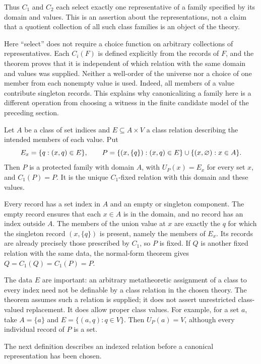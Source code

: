 Thus $C_1$ and $C_2$ each select exactly one representative of a family
specified by its domain and values. This is an assertion about the
representations, not a claim that a quotient collection of all such
class families is an object of the theory.

Here ``select'' does not require a choice function on arbitrary
collections of representatives. Each $C_i(F)$ is defined explicitly
from the records of $F$, and the theorem proves that it is independent
of which relation with the same domain and values was supplied.
Neither a well-order of the universe nor a choice of one member from
each nonempty value is used. Indeed, all members of a value contribute
singleton records. This explains why canonicalizing a family here is
a different operation from choosing a witness in the finite candidate
model of the preceding section.

\begin{theorem}
Let $A$ be a class of set indices and $E\subseteq A\times V$ a class
relation describing the intended members of each value. Put
\[
E_x=\{q:(x,q)\in E\},\qquad
P=\{(x,\{q\}):(x,q)\in E\}
       \cup\{(x,\varnothing):x\in A\}.
\]
Then $P$ is a protected family with domain $A$, with
$U_P(x)=E_x$ for every set $x$, and $C_1(P)=P$. It is the unique
$C_1$-fixed relation with this domain and these values.
\end{theorem}
\Proof
Every record has a set index in $A$ and an empty or singleton component.
The empty record ensures that each $x\in A$ is in the domain, and no
record has an index outside $A$. The members of the union value at $x$
are exactly the $q$ for which the singleton record $(x,\{q\})$ is
present, namely the members of $E_x$. Its records are already precisely
those prescribed by $C_1$, so $P$ is fixed. If $Q$ is another fixed
relation with the same data, the normal-form theorem gives
$Q=C_1(Q)=C_1(P)=P$.
\Done

The data $E$ are important: an arbitrary metatheoretic assignment of a
class to every index need not be definable by a class relation in the
chosen theory. The theorem assumes such a relation is supplied; it does
not assert unrestricted class-valued replacement. It does allow proper
class values. For example, for a set $a$, take $A=\{a\}$ and
$E=\{(a,q):q\in V\}$. Then $U_P(a)=V$, although every individual
record of $P$ is a set.

The next definition describes an indexed relation before a canonical
representation has been chosen.

